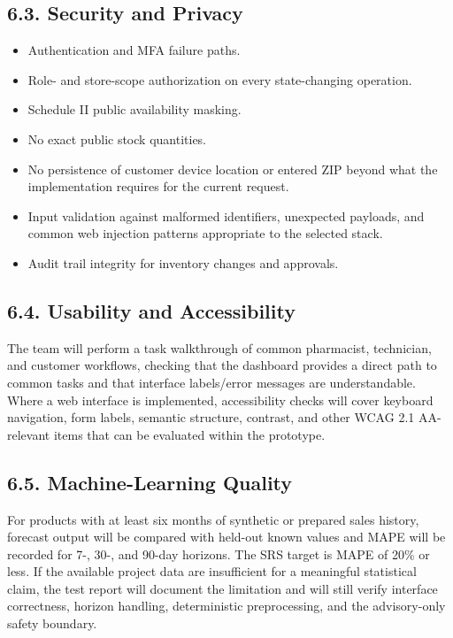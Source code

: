 \subsection{6.3. Security and Privacy}\label{security-and-privacy}

\begin{itemize}
\item
  Authentication and MFA failure paths.
\item
  Role- and store-scope authorization on every state-changing operation.
\item
  Schedule II public availability masking.
\item
  No exact public stock quantities.
\item
  No persistence of customer device location or entered ZIP beyond what the implementation requires for the current request.
\item
  Input validation against malformed identifiers, unexpected payloads, and common web injection patterns appropriate to the selected stack.
\item
  Audit trail integrity for inventory changes and approvals.
\end{itemize}

\subsection{6.4. Usability and Accessibility}\label{usability-and-accessibility}

The team will perform a task walkthrough of common pharmacist, technician, and customer workflows, checking that the dashboard provides a direct path to common tasks and that interface labels/error messages are understandable. Where a web interface is implemented, accessibility checks will cover keyboard navigation, form labels, semantic structure, contrast, and other WCAG 2.1 AA-relevant items that can be evaluated within the prototype.

\subsection{6.5. Machine-Learning Quality}\label{machine-learning-quality}

For products with at least six months of synthetic or prepared sales history, forecast output will be compared with held-out known values and MAPE will be recorded for 7-, 30-, and 90-day horizons. The SRS target is MAPE of 20\% or less. If the available project data are insufficient for a meaningful statistical claim, the test report will document the limitation and will still verify interface correctness, horizon handling, deterministic preprocessing, and the advisory-only safety boundary.

